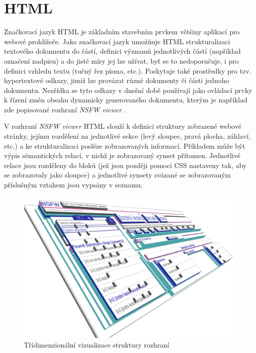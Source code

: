 \documentclass[a4paper, 11pt, oneside]{book}
\newcommand{\simplywn}{\textit{NSFW viewer} }
\begin{document}
			\section{HTML}

				Značkovací jazyk HTML je základním stavebním prvkem většiny aplikací pro webové prohlížeče. Jako značkovací jazyk umožňuje HTML strukturalizaci textového dokumentu do částí, definici významů jednotlivých částí (například označení nadpisu) a do jisté míry jej lze užívat, byť se to nedoporučuje, i pro definici vzhledu textu (tučný řez písma, etc.). Poskytuje také prostředky pro tzv. hypertextové odkazy, jimiž lze provázat různé dokumenty či části jednoho dokumentu. Nezřídka se tyto odkazy v dnešní době používají jako ovládací prvky k řízení změn obsahu dynamicky generovaného dokumentu, kterým je například zde popisované rozhraní \simplywn. 

				V rozhraní \simplywn HTML slouží k definici struktury zobrazené webové stránky, jejímu rozdělení na jednotlivé sekce (levý sloupec, pravá plocha, záhlaví, etc.) a ke strukturalizaci posléze zobrazovaných informací. Příkladem může být výpis sémantických relací, v nichž je zobrazovaný synset přítomen. Jednotlivé relace jsou rozděleny do bloků (jež jsou později pomocí CSS nastaveny tak, aby se zobrazovaly jako sloupce) a jednotlivé synsety svázané se zobrazovaným příslušným vztahem jsou vypsány v seznamu. 

				\begin{figure}[h]
					\centering
					\includegraphics[width=1.0\textwidth]{html3d2.png}
					\caption{Třídimenzionální vizualizace struktury rozhraní}
					\label{fig:html3d}
				\end{figure}
\end{document}

